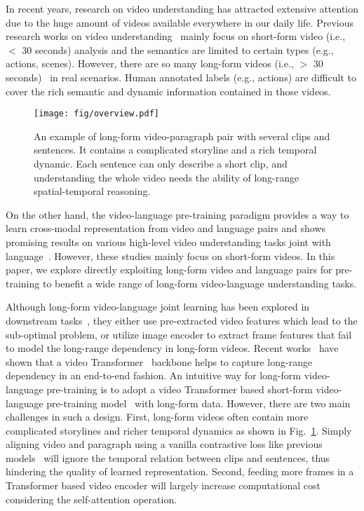 \documentclass{article}
\begin{document}
In recent years, research on video understanding has attracted extensive attention due to the huge amount of videos available everywhere in our daily life. 
Previous research works on video understanding~\cite{feichtenhofer2019slowfast,feichtenhofer2016two-stream-fusion,simonyan2014two-stream,tran2015c3d,zhao2017tsn} mainly focus on short-form video (i.e., $<$ 30 seconds) analysis and the semantics are limited to certain types (e.g., actions, scenes).
However, there are so many long-form videos (i.e., $>$ 30 seconds)~\cite{wu2021towards-longform} in real scenarios. Human annotated labels (e.g., actions) are difficult to cover the rich semantic and dynamic information contained in those videos.
\begin{figure}
    \centering
    \texttt{[image: fig/overview.pdf]}
    \caption{An example of long-form video-paragraph pair with several clips and sentences. It contains a complicated storyline and a rich temporal dynamic. Each sentence can only describe a short clip, and understanding the whole video needs the ability of long-range spatial-temporal reasoning.\vspace{-5mm}}
    \label{fig:overview}
    \vspace{-5mm}
\end{figure}
On the other hand, the video-language pre-training paradigm provides a way to learn cross-modal representation from video and language pairs and shows promising results on various high-level video understanding tasks joint with language~\cite{bain2021frozen,li2020hero, xue2021hdvila,zellers2021merlot}. However, these studies mainly focus on short-form videos. In this paper, we explore directly exploiting long-form video and language pairs for pre-training to benefit a wide range of long-form video-language understanding tasks.

Although long-form video-language joint learning has been explored in downstream tasks~\cite{ging2020coot,li2020hero,li2021value,liu2020violin,yu2019activitynetqa,zhang2018hse,zhuang2020multichannel-vqa}, they either use pre-extracted video features which lead to the sub-optimal problem, or utilize image encoder to extract frame features that fail to model the long-range dependency in long-form videos. Recent works~\cite{bain2021frozen,bertasius2021timesformer,liu2021videoswin} have shown that a video Transformer~\cite{vaswani2017transformer} backbone helps to capture long-range dependency in an end-to-end fashion.
An intuitive way for long-form video-language pre-training is to adopt a video Transformer based short-form video-language pre-training model~\cite{bain2021frozen,xue2021hdvila} with long-form data. 
However, there are two main challenges in such a design.
First, long-form videos often contain more complicated storylines and richer temporal dynamics as shown in Fig.~\ref{fig:overview}. Simply aligning video and paragraph using a vanilla contrastive loss like previous models~\cite{bain2021frozen,xue2021hdvila} will ignore the temporal relation between clips and sentences, thus hindering the quality of learned representation.
Second, feeding more frames in a Transformer based video encoder will largely increase computational cost considering the self-attention operation.
\end{document}
